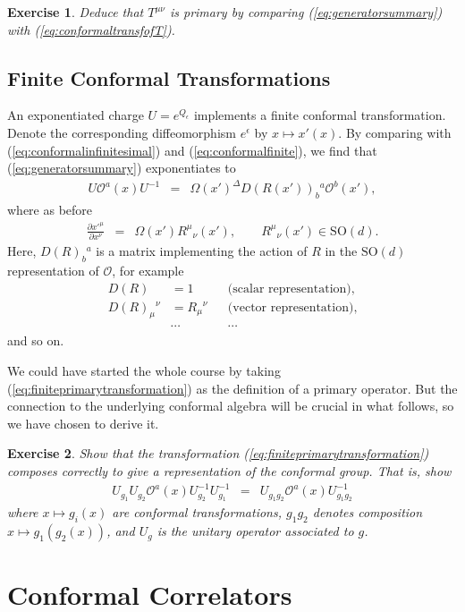 \documentclass{ws-rv9x6}
\newcommand\be{\begin{eqnarray}}
\newcommand\ee{\end{eqnarray}}
\newcommand\cO{\mathcal{O}}
\newcommand\e\epsilon
\newcommand\<\langle
\renewcommand\>\rangle
\newcommand\nn{\nonumber}
\renewcommand\.{\cdot}
\newcommand\pdr[2]{\frac{\partial #1}{\partial #2}}
\newcommand\SO{\mathrm{SO}}
\newcommand\De{\Delta}
\newtheorem{exercise}{Exercise}[section]
\begin{document}
\begin{exercise}
Deduce that $T^{\mu\nu}$ is primary by comparing (\ref{eq:generatorsummary}) with (\ref{eq:conformaltransfofT}). 
\end{exercise}

\subsection{Finite Conformal Transformations}

An exponentiated charge $U=e^{Q_\e}$ implements a finite conformal transformation.  Denote the corresponding diffeomorphism $e^{\e}$ by $x\mapsto x'(x)$. By comparing with (\ref{eq:conformalinfinitesimal}) and (\ref{eq:conformalfinite}), we find that (\ref{eq:generatorsummary}) exponentiates to
\be
\label{eq:finiteprimarytransformation}
U \cO^a(x) U^{-1} &=& \Omega(x')^\De D(R(x'))_b{}^a\cO^b(x'),
\ee
where as before
\be
\pdr{x'^\mu}{x^\nu} &=& \Omega(x')R^\mu{}_\nu(x'),\qquad R^\mu{}_\nu(x')\in\SO(d).
\ee
Here, $D(R)_b{}^a$ is a matrix implementing the action of $R$ in the $\SO(d)$ representation of $\cO$, for example
\begin{align}
D(R) &= 1 && \textrm{(scalar representation)},\nn\\
D(R)_\mu{}^\nu &= R_\mu{}^\nu && \textrm{(vector representation)},\label{eq:vectorrep}\nn\\
 &\cdots&& \cdots
\end{align}
and so on.

We could have started the whole course by taking (\ref{eq:finiteprimarytransformation}) as the definition of a primary operator. But the connection to the underlying conformal algebra will be crucial in what follows, so we have chosen to derive it.

\begin{exercise}
Show that the transformation (\ref{eq:finiteprimarytransformation}) composes correctly to give a representation of the conformal group.  That is, show
\be
U_{g_1}U_{g_2}\cO^a(x) U_{g_2}^{-1} U_{g_1}^{-1} &=& U_{g_1g_2}\cO^a(x)U_{g_1g_2}^{-1}
\ee
where $x\mapsto g_{i}(x)$ are conformal transformations, $g_1g_2$ denotes composition $x\mapsto g_1(g_2(x))$, and $U_{g}$ is the unitary operator associated to $g$.
\end{exercise}

\section{Conformal Correlators}
\end{document}
